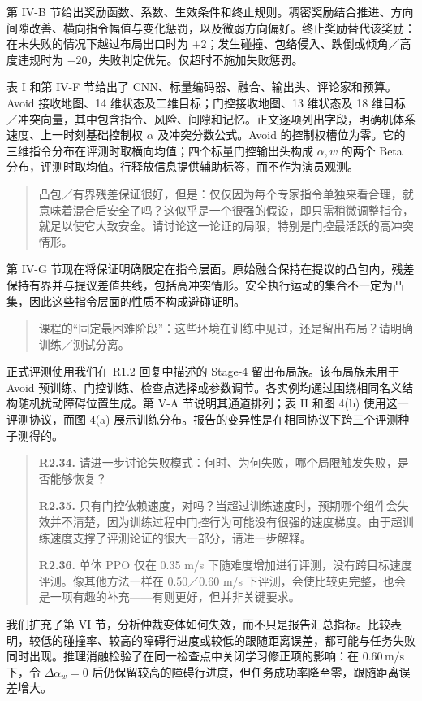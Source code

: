 第 IV-B 节给出奖励函数、系数、生效条件和终止规则。稠密奖励结合推进、方向间隙改善、横向指令幅值与变化惩罚，以及微弱方向偏好。终止奖励替代该奖励：在未失败的情况下越过布局出口时为 $+2$；发生碰撞、包络侵入、跌倒或倾角／高度违规时为 $-20$，失败判定优先。仅超时不施加失败惩罚。

表 I 和第 IV-F 节给出了 CNN、标量编码器、融合、输出头、评论家和预算。Avoid 接收地图、14 维状态及二维目标；门控接收地图、13 维状态及 18 维目标／冲突向量，其中包含指令、风险、间隙和记忆。正文逐项列出字段，明确机体系速度、上一时刻基础控制权 $\alpha$ 及冲突分数公式。Avoid 的控制权槽位为零。它的三维指令分布在评测时取横向均值；四个标量门控输出头构成 $\alpha,w$ 的两个 Beta 分布，评测时取均值。行释放信息提供辅助标签，而不作为演员观测。

\begin{quote}
凸包／有界残差保证很好，但是：仅仅因为每个专家指令单独来看合理，就意味着混合后安全了吗？这似乎是一个很强的假设，即只需稍微调整指令，就足以使它大致安全。请讨论这一论证的局限，特别是门控最活跃的高冲突情形。
\end{quote}
\response
第 IV-G 节现在将保证明确限定在指令层面。原始融合保持在提议的凸包内，残差保持有界并与提议差值共线，包括高冲突情形。安全执行运动的集合不一定为凸集，因此这些指令层面的性质不构成避碰证明。

\begin{quote}
课程的“固定最困难阶段”：这些环境在训练中见过，还是留出布局？请明确训练／测试分离。
\end{quote}
\response
正式评测使用我们在 R1.2 回复中描述的 Stage-4 留出布局族。该布局族未用于 Avoid 预训练、门控训练、检查点选择或参数调节。各实例均通过围绕相同名义结构随机扰动障碍位置生成。第 V-A 节说明其通道排列；表 II 和图 4(b) 使用这一评测协议，而图 4(a) 展示训练分布。报告的变异性是在相同协议下跨三个评测种子测得的。

\begin{quote}
\textbf{R2.34.} 请进一步讨论失败模式：何时、为何失败，哪个局限触发失败，是否能够恢复？

\textbf{R2.35.} 只有门控依赖速度，对吗？当超过训练速度时，预期哪个组件会失效并不清楚，因为训练过程中门控行为可能没有很强的速度梯度。由于超训练速度支撑了评测论证的很大一部分，请进一步解释。

\textbf{R2.36.} 单体 PPO 仅在 0.35 m/s 下随难度增加进行评测，没有跨目标速度评测。像其他方法一样在 0.50／0.60 m/s 下评测，会使比较更完整，也会是一项有趣的补充——有则更好，但并非关键要求。
\end{quote}
\response
我们扩充了第 VI 节，分析仲裁变体如何失效，而不只是报告汇总指标。比较表明，较低的碰撞率、较高的障碍行进度或较低的跟随距离误差，都可能与任务失败同时出现。推理消融检验了在同一检查点中关闭学习修正项的影响：在 $0.60\,\mathrm{m/s}$ 下，令 $\Delta\alpha_w=0$ 后仍保留较高的障碍行进度，但任务成功率降至零，跟随距离误差增大。

